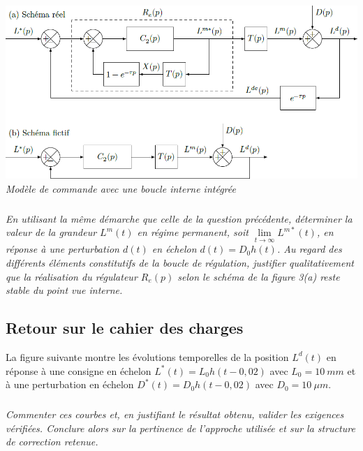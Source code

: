 \begin{multicols}{2}
\begin{center}
\includegraphics[width=\linewidth]{images/fig_05}
\textit{Modèle de commande avec une boucle interne intégrée}
\end{center}


\subparagraph{}\textit{En utilisant la même démarche que celle de la question précédente, déterminer la valeur de la grandeur $L^{m}(t)$ en régime permanent, soit 
$\lim\limits_{t\to\infty} L^{m*}(t)$, en réponse à une perturbation $d(t)$ en échelon $d(t)=D_0 h(t)$. Au regard des différents éléments constitutifs de la boucle de régulation, justifier qualitativement que la réalisation du régulateur $R_e(p)$ selon le schéma de la figure 3(a) reste stable du point vue interne.}

\ifprof
\begin{corrige}
\end{corrige}
\else
\fi

\subsection*{Retour sur le cahier des charges}
La figure suivante montre les évolutions temporelles de la position $L^d(t)$ en réponse
à une consigne en échelon $L^*(t)=L_0 h(t-0,02)$ avec $L_0 = \SI{10}{mm}$ et à une perturbation en échelon $D^*(t) = D_0 h(t-0,02)$ avec $D_0=\SI{10}{\mu m}$. 

\subparagraph{}\textit{Commenter ces courbes et, en justifiant le résultat obtenu, valider les exigences vérifiées. Conclure alors sur la pertinence de l’approche utilisée et sur la structure de correction retenue.}

\ifprof
\begin{corrige}
\end{corrige}
\else
\fi
\end{multicols}

